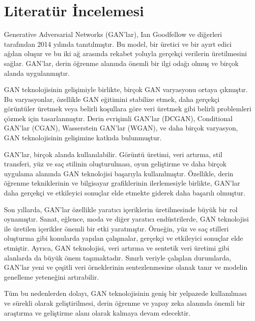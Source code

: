 \documentclass[12pt]{article}
\begin{document}
\section{Literatür İncelemesi}
Generative Adversarial Networks (GAN'lar), Ian Goodfellow ve diğerleri tarafından 2014 yılında tanıtılmıştır. Bu model, bir üretici ve bir ayırt edici ağdan oluşur ve bu iki ağ arasında rekabet yoluyla gerçekçi verilerin üretilmesini sağlar. GAN'lar, derin öğrenme alanında önemli bir ilgi odağı olmuş ve birçok alanda uygulanmıştır.\cite{OpenAI}

GAN teknolojisinin gelişimiyle birlikte, birçok GAN varyasyonu ortaya çıkmıştır. Bu varyasyonlar, özellikle GAN eğitimini stabilize etmek, daha gerçekçi görüntüler üretmek veya belirli koşullara göre veri üretmek gibi belirli problemleri çözmek için tasarlanmıştır. Derin evrişimli GAN'lar (DCGAN), Conditional GAN'lar (CGAN), Wasserstein GAN'lar (WGAN), ve daha birçok varyasyon, GAN teknolojisinin gelişimine katkıda bulunmuştur.

GAN'lar, birçok alanda kullanılabilir. Görüntü üretimi, veri artırma, stil transferi, yüz ve saç stilinin oluşturulması, oyun geliştirme ve daha birçok uygulama alanında GAN teknolojisi başarıyla kullanılmıştır. Özellikle, derin öğrenme tekniklerinin ve bilgisayar grafiklerinin ilerlemesiyle birlikte, GAN'lar daha gerçekçi ve etkileyici sonuçlar elde etmekte giderek daha başarılı olmuştur.

Son yıllarda, GAN'lar özellikle yaratıcı içeriklerin üretilmesinde büyük bir rol oynamıştır. Sanat, eğlence, moda ve diğer yaratıcı endüstrilerde, GAN teknolojisi ile üretilen içerikler önemli bir etki yaratmıştır. Örneğin, yüz ve saç stilleri oluşturma gibi konularda yapılan çalışmalar, gerçekçi ve etkileyici sonuçlar elde etmiştir. Ayrıca, GAN teknolojisi, veri artırma ve sentetik veri üretimi gibi alanlarda da büyük önem taşımaktadır. Sınırlı veriyle çalışılan durumlarda, GAN'lar yeni ve çeşitli veri örneklerinin sentezlenmesine olanak tanır ve modelin genelleme yeteneğini artırabilir.

Tüm bu nedenlerden dolayı, GAN teknolojisinin geniş bir yelpazede kullanılması ve sürekli olarak geliştirilmesi, derin öğrenme ve yapay zeka alanında önemli bir araştırma ve geliştirme alanı olarak kalmaya devam edecektir.
\end{document}
